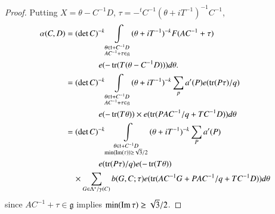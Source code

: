 \begin{proof}
Putting $X=\theta-C^{-1}D$,
$\tau=-{}^{t}C^{-1}(\theta+iT^{-1})^{-1}C^{-1}$,
\begin{align*}
\alpha(C,D) &= (\det
C)^{-k}\int\limits_{\substack{\theta\in\mathfrak{t}+C^{-1}D\\ 
AC^{-1}+\tau\in\mathfrak{g}}}(\theta+iT^{-1})^{-k}F(AC^{-1}+\tau)\\
&\qquad\qquad e(-\operatorname{tr}(T(\theta-C^{-1}D)))d\theta.\\
&= (\det C)^{-k}\int\limits_{\substack{\theta\in\mathfrak{t}+C^{-1}D\\ AC^{-1}+\tau
    \in\mathfrak{g}}}(\theta+iT^{-1})^{-k}\sum_{p}a'(P)e(\operatorname{tr}(P\tau)/q)\\
&\qquad\qquad e(-\operatorname{tr}(T\theta))
\times e(\operatorname{tr}(PAC^{-1}/q+TC^{-1}D))d\theta\\
&= (\det
C)^{-k}\int\limits_{\substack{\theta\in\mathfrak{t}+C^{-1}D\\ \min(\operatorname{Im}(\tau))\geq
    \sqrt{3}/2}}(\theta+iT^{-1})^{-k}\sum_{P}a'(P)\\
&\qquad\qquad e(\operatorname{tr}(P\tau)/q)e(-\operatorname{tr}(T\theta))\\
&\quad \times
\sum_{G\in\Lambda^{\ast}/\gamma(C)}b(G,C;\tau)e(\operatorname{tr}(AC^{-1}G+PAC^{-1}/q+TC^{-1}D))d\theta 
\end{align*}
since $AC^{-1}+\tau\in\mathfrak{g}$ implies $\min(\operatorname{Im} \tau)\geq \sqrt{3}/2$.
\end{proof}

